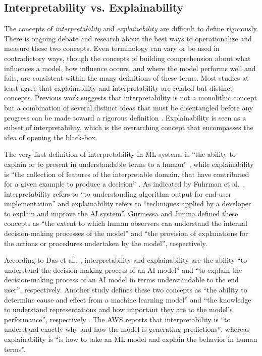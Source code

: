 \documentclass[final,5p,times,twocolumn]{elsarticle}
\begin{document}
\subsection{Interpretability vs. Explainability}
The concepts of \textit{interpretability} and \textit{explainability} are difficult to define rigorously. There is ongoing debate and research about the best ways to operationalize and measure these two concepts. Even terminology can vary or be used in contradictory ways, though the concepts of building comprehension about what influences a model, how influence occurs, and where the model performs well and fails, are consistent within the many definitions of these terms. Most studies at least agree that explainability and interpretability are related but distinct concepts. Previous work suggests that interpretability is not a monolithic concept but a combination of several distinct ideas that must be disentangled before any progress can be made toward a rigorous definition \cite{lipton2018mythos}. Explainability is seen as a subset of interpretability, which is the overarching concept that encompasses the idea of opening the black-box. 

The very first definition of interpretability in ML systems is ``the ability to explain or to present in understandable terms to a human'' \cite{doshi2017towards}, while explainability is ``the collection of features of the interpretable domain, that have contributed for a given example to produce a decision'' \cite{montavon2018methods}. As indicated by Fuhrman et al. \cite{fuhrman2022review}, interpretability refers to ``to understanding algorithm output for end‐user implementation'' and explainability refers to ``techniques applied by a developer to explain and improve the AI system''. Gurmessa and Jimma \cite{gurmessa2023comprehensive} defined these concepts as ``the extent to which human observers can understand the internal decision-making processes of the model'' and ``the provision of explanations for the actions or procedures undertaken by the model'', respectively.

According to Das et al., \cite{das2020opportunities}, interpretability and explainability are the ability ``to understand the decision-making process of an AI model'' and ``to explain the decision-making process of an AI model in terms understandable to the end user'', respectively. Another study defines these two concepts as ``the ability to determine cause and effect from a machine learning model'' and ``the knowledge to understand representations and how important they are to the model’s performance'', respectively \cite{gilpin2018explaining}. The AWS reports that interpretability is ``to understand exactly why and how the model is generating predictions'', whereas explainability is ``is how to take an ML model and explain the behavior in human terms''.
\end{document}
